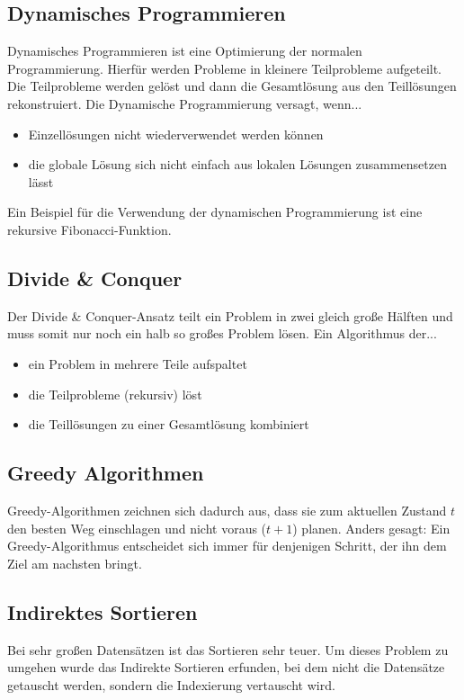 \documentclass[12pt,a4paper]{article}
\begin{document}
\subsection{Dynamisches Programmieren}
Dynamisches Programmieren ist eine Optimierung der normalen Programmierung. Hierfür werden Probleme in kleinere Teilprobleme aufgeteilt. Die Teilprobleme werden gelöst und dann die Gesamtlösung aus den Teillösungen rekonstruiert.\newline
Die Dynamische Programmierung versagt, wenn...
\vspace{.35cm}
\begin{itemize}
	\item Einzellösungen nicht wiederverwendet werden können
	\item die globale Lösung sich nicht einfach aus lokalen Lösungen zusammensetzen lässt
\end{itemize}
\vspace{.35cm}
Ein Beispiel für die Verwendung der dynamischen Programmierung ist eine rekursive Fibonacci-Funktion.

\subsection{Divide \& Conquer}
Der Divide \& Conquer-Ansatz teilt ein Problem in zwei gleich große Hälften und muss somit nur noch ein halb so großes Problem lösen.\newline
Ein Algorithmus der...
\begin{itemize}
	\item ein Problem in mehrere Teile aufspaltet
	\item die Teilprobleme (rekursiv) löst
	\item die Teillösungen zu einer Gesamtlösung kombiniert
\end{itemize}

\subsection{Greedy Algorithmen}
Greedy-Algorithmen zeichnen sich dadurch aus, dass sie zum aktuellen Zustand $t$ den besten Weg einschlagen und nicht voraus ($t+1$) planen. Anders gesagt: Ein Greedy-Algorithmus entscheidet sich immer für denjenigen Schritt, der ihn dem Ziel am nachsten bringt.

\subsection{Indirektes Sortieren}
Bei sehr großen Datensätzen ist das Sortieren sehr teuer. Um dieses Problem zu umgehen wurde das Indirekte Sortieren erfunden, bei dem nicht die Datensätze getauscht werden, sondern die Indexierung vertauscht wird.
\end{document}
